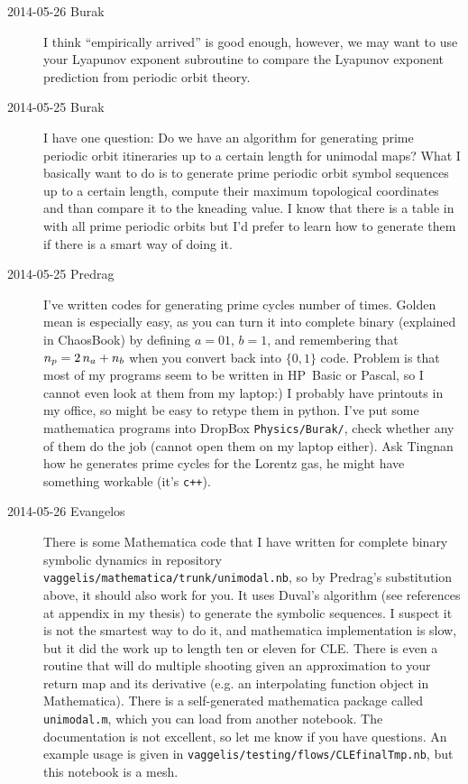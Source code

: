 \begin{description}
\item[2014-05-26 Burak] I think ``empirically arrived'' is good enough, however,
we may want to use your Lyapunov exponent subroutine to compare the Lyapunov
exponent prediction from periodic orbit theory.

\item[2014-05-25 Burak] I have one question: Do we have an algorithm for
generating prime periodic orbit itineraries up to a certain length for
unimodal maps? What I basically want to do is to generate prime periodic
orbit symbol sequences up to a certain length, compute their maximum topological
coordinates and than compare it to the kneading value. I know that there
is a table in  with all prime periodic orbits but I'd prefer
to learn how to generate them if there is a smart way of doing it.

\item[2014-05-25 Predrag] I've written codes for generating prime cycles
number of times. Golden mean is especially easy, as you can turn it into
complete binary (explained in ChaosBook) by defining $a=01$, $b=1$, and
remembering that ${n_{p}}=2\,n_a+n_b$ when you convert back into $\{0,1\}$
code. Problem is that most of my programs seem to be written in HP~Basic
or Pascal, so I cannot even look at them from my laptop:) I probably have
printouts in my office, so might be easy to retype them in python. I've
put some mathematica programs into DropBox \texttt{Physics/Burak/}, check
whether any of them do the job (cannot open them on my laptop either).
Ask Tingnan how he generates prime cycles for the Lorentz gas, he might
have something workable (it's \texttt{c++}).

\item[2014-05-26 Evangelos] There is some Mathematica code that I have
written for complete binary symbolic dynamics in repository
\texttt{vaggelis/mathematica/trunk/unimodal.nb},
so by Predrag's substitution above,
it should also work for you. It uses Duval's algorithm (see
references at appendix in my thesis) to generate the symbolic
sequences. I suspect it is not the smartest way to do it, and mathematica
implementation is slow, but it did the work up to length ten or eleven for
CLE. There is even a routine that will do multiple shooting given
an approximation to your return map and its derivative (e.g. an interpolating
function object in Mathematica).
There is a self-generated mathematica package called \texttt{unimodal.m},
which you can load from another notebook. The documentation
is not excellent, so let me know if you have questions. An example
usage is given in \texttt{vaggelis/testing/flows/CLEfinalTmp.nb},
but this notebook is a mesh.


\end{description}
